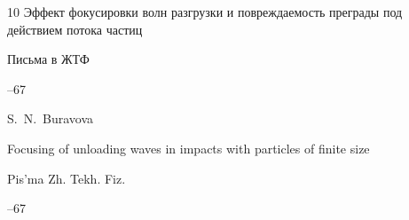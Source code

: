 \begin{thebibliography}{10}
\paper Эффект фокусировки волн разгрузки и повреждаемость преграды под действием потока частиц

\jour Письма в ЖТФ




--67

\misctransl

\by S.~N.~Buravova

\paper Focusing of unloading waves in impacts with particles of finite size

\jour Pis'ma Zh. Tekh. Fiz.



–67 










\end{thebibliography}



\noindent

\hskip6.5cm \thedate \par\noindent

\hskip6.5cm\therevdate







%







\makeengtitle





\renewcommand{\baselinestretch}{0.9}



\newpage





%

% 